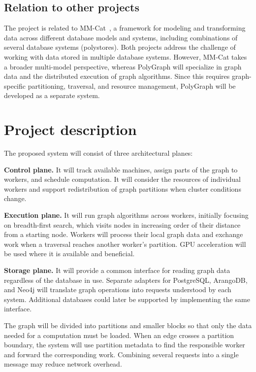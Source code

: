 \documentclass[a4paper]{article}
\begin{document}
\subsection{Relation to other projects}

The project is related to MM-Cat~\cite{mmcat}, a framework for modeling and transforming data across different database models and systems, including combinations of several database systems (polystores). Both projects address the challenge of working with data stored in multiple database systems. However, MM-Cat takes a broader multi-model perspective, whereas PolyGraph will specialize in graph data and the distributed execution of graph algorithms. Since this requires graph-specific partitioning, traversal, and resource management, PolyGraph will be developed as a separate system.

\section{Project description}

The proposed system will consist of three architectural planes:

\noindent\textbf{Control plane.} It will track available machines, assign parts of the graph to workers, and schedule computation. It will consider the resources of individual workers and support redistribution of graph partitions when cluster conditions change.

\medskip
\noindent\textbf{Execution plane.} It will run graph algorithms across workers, initially focusing on breadth-first search, which visits nodes in increasing order of their distance from a starting node. Workers will process their local graph data and exchange work when a traversal reaches another worker's partition. GPU acceleration will be used where it is available and beneficial.

\medskip
\noindent\textbf{Storage plane.} It will provide a common interface for reading graph data regardless of the database in use. Separate adapters for PostgreSQL, ArangoDB, and Neo4j will translate graph operations into requests understood by each system. Additional databases could later be supported by implementing the same interface.

The graph will be divided into partitions and smaller blocks so that only the data needed for a computation must be loaded. When an edge crosses a partition boundary, the system will use partition metadata to find the responsible worker and forward the corresponding work. Combining several requests into a single message may reduce network overhead.
\end{document}
